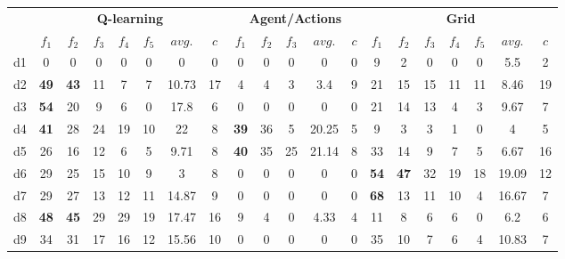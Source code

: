 \setlength{\tabcolsep}{4pt}
\begin{tabular*}{\linewidth}{ @{\extracolsep{\fill}}c | ccccccc | ccccc | ccccccc @{}}
\toprule
& \multicolumn{7}{c|}{\textbf{Q-learning}} & \multicolumn{5}{c|}{\textbf{Agent/Actions}} & \multicolumn{7}{c}{\textbf{Grid}} \\

& $f_1$ & $f_2$  & $f_3$  & $f_4$ & $f_5$ & $avg.$ & $c$ 
& $f_1$ & $f_2$  & $f_3$  & $avg.$ & $c$
& $f_1$ & $f_2$  & $f_3$  & $f_4$ & $f_5$ & $avg.$ & $c$  \\
\midrule

d1 &  0 & 0  &  0  &  0  &  0 &  0  &  0 
     & 0 & 0  &  0  &  0  &  0   
    &  9 & 2  &  0  &  0  &  0 &  5.5  &  2  \\

d2 &  \textbf{{\color{red}49}} & \textbf{{\color{red}43}}  &  11  &  7  &  7  &  10.73  &  17
     & 4  & 4  &  3  &  3.4  &  9 
    &  21 &  15 &   15  &  11 &  11 &  8.46  &  19  \\

d3 &  \textbf{{\color{red}54}} & 20  & 9  &  6  &  0 &  17.8  &  6
     & 0 & 0  &  0  &  0  &  0   
    &  21 & 14  &  13  &  4  &  3 &  9.67 &  7  \\

d4 &  \textbf{{\color{red}41}}& 28  &  24  & 19  &  10 &  22  &  8 
     & \textbf{{\color{red}39}} & 36  &  5  &  20.25  &  5  
    &  9 & 3  & 3  &  1  & 0 &  4  &  5  \\

d5 &  26 & 16  &  12  &  6  &  5 &  9.71  &  8
     & \textbf{{\color{red}40}} & 35  &  25  &  21.14  &  8  
    &  33 & 14  &  9  &  7  &  5 &  6.67  &  16  \\

d6 &  29 & 25  &  15  &  10  &  9 &  3  &  8 
     & 0 & 0  &  0  &  0  &  0   
    &  \textbf{{\color{red}54}} & \textbf{{\color{red}47}}  &  32  &  19  &  18 &  19.09  &  12  \\

d7 &  29 & 27  &  13  &  12  &  11 &  14.87  &  9 
     & 0 & 0  &  0  &  0  &  0   
    &  \textbf{{\color{red}68}} & 13  &  11  &  10  &  4 &  16.67  &  7  \\

d8 &  \textbf{{\color{red}48}} & \textbf{{\color{red}45}}  &  29  &  29  &  19 &  17.47  &  16 
     & 9 & 4  &  0  &  4.33  &  4  
    &  11 & 8  &  6  &  6  &  0 &  6.2  &  6  \\

d9 &  34 & 31  &  17  &  16  &  12 &  15.56  &  10 
     & 0 & 0  &  0  &  0  &  0   
    &  35 & 10  &  7  &  6  & 4 &  10.83  &  7  \\


\end{tabular*}
